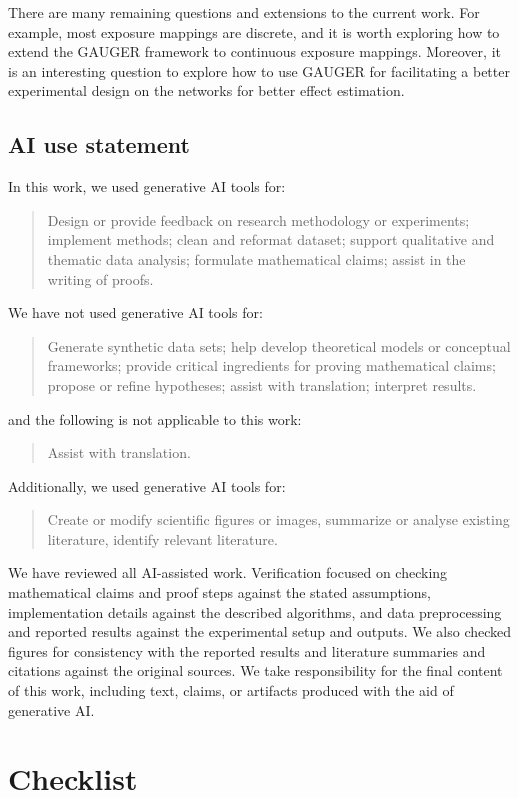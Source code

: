 \documentclass[twoside]{article}
\theoremstyle{plain}
\theoremstyle{definition}
\theoremstyle{remark}
\begin{document}
There are many remaining questions and extensions to the current work. For example, most exposure mappings are discrete, and it is worth exploring how to extend the GAUGER framework to continuous exposure mappings. Moreover, it is an interesting question to explore how to use GAUGER for facilitating a better experimental design on the networks for better effect estimation.

\subsection*{AI use statement}

In this work, we used generative AI tools for:
\begin{quote}
Design or provide feedback on research methodology or experiments; implement methods; clean and reformat dataset; support qualitative and thematic data analysis; formulate mathematical claims; assist in the writing of proofs.
\end{quote}
We have not used generative AI tools for:
\begin{quote}
Generate synthetic data sets; help develop theoretical models or conceptual frameworks; provide critical ingredients for proving mathematical claims; propose or refine hypotheses; assist with translation; interpret results.
\end{quote}
and the following is not applicable to this work:
\begin{quote}
Assist with translation.
\end{quote}
Additionally, we used generative AI tools for:
\begin{quote}
Create or modify scientific figures or images, summarize or analyse existing literature, identify relevant literature.
\end{quote}
We have reviewed all AI-assisted work. Verification focused on checking mathematical claims and proof steps against the stated assumptions, implementation details against the described algorithms, and data preprocessing and reported results against the experimental setup and outputs. We also checked figures for consistency with the reported results and literature summaries and citations against the original sources. We take responsibility for the final content of this work, including text, claims, or artifacts produced with the aid of generative AI.



\clearpage
\section*{Checklist}
\end{document}
